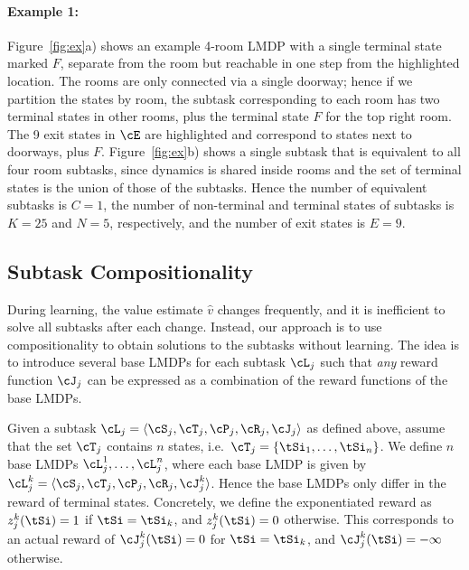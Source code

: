 \paragraph{Example 1:} Figure~\ref{fig:ex}a) shows an example 4-room LMDP with a single terminal state marked $F$, separate from the room but reachable in one step from the highlighted location. The rooms are only connected via a single doorway; hence if we partition the states by room, the subtask corresponding to each room has two terminal states in other rooms, plus the terminal state $F$ for the top right room. The 9 exit states in $\cE$ are highlighted and correspond to states next to doorways, plus $F$. Figure~\ref{fig:ex}b) shows a single subtask that is equivalent to all four room subtasks, since dynamics is shared inside rooms and the set of terminal states is the union of those of the subtasks.
Hence the number of equivalent subtasks is $C=1$, the number of non-terminal and terminal states of subtasks is $K=25$ and $N=5$, respectively, and the number of exit states is $E=9$.

\subsection{Subtask Compositionality}

During learning, the value estimate $\hat{v}$ changes frequently, and it is inefficient to solve all subtasks after each change. Instead, our approach is to use compositionality to obtain solutions to the subtasks without learning. The idea is to introduce several base LMDPs for each subtask $\cL_j$ such that {\em any} reward function $\cJ_j$ can be expressed as a combination of the reward functions of the base LMDPs.

Given a subtask $\cL_j=\langle\cS_j,\cT_j,\cP_j,\cR_j,\cJ_j\rangle$ as defined above, assume that the set $\cT_j$ contains $n$ states, i.e.~$\cT_j=\{\tSi_1,\ldots,\tSi_n\}$. We define $n$ base LMDPs $\cL_j^1,\ldots,\cL_j^n$, where each base LMDP is given by $\cL_j^k=\langle\cS_j,\cT_j,\cP_j,\cR_j,\cJ_j^k\rangle$. Hence the base LMDPs only differ in the reward of terminal states.
Concretely, we define the exponentiated reward as $z_j^k(\tSi)=1$ if $\tSi=\tSi_k$, and $z_j^k(\tSi)=0$ otherwise.
This corresponds to an actual reward of $\cJ_j^k(\tSi)=0$ for $\tSi=\tSi_k$, and $\cJ_j^k(\tSi)=-\infty$ otherwise.


